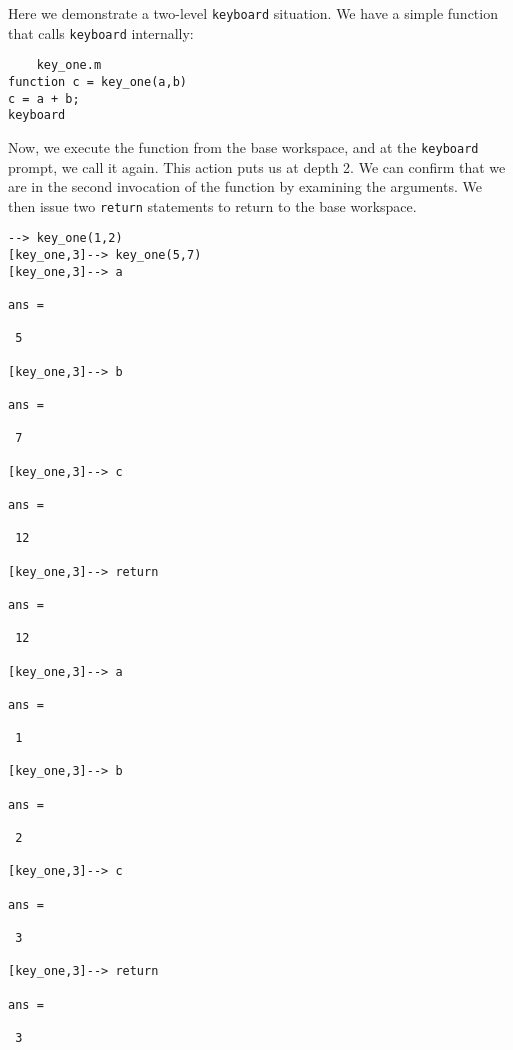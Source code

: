Here we demonstrate a two-level \verb|keyboard| situation.  We have
a simple function that calls \verb|keyboard| internally:
\begin{verbatim}
    key_one.m
function c = key_one(a,b)
c = a + b;
keyboard
\end{verbatim}
Now, we execute the function from the base workspace, and
at the \verb|keyboard| prompt, we call it again.  This action
puts us at depth 2.  We can confirm that we are in the second
invocation of the function by examining the arguments.  We
then issue two \verb|return| statements to return to the base
workspace.
\begin{verbatim}
--> key_one(1,2)
[key_one,3]--> key_one(5,7)
[key_one,3]--> a

ans = 

 5 

[key_one,3]--> b

ans = 

 7 

[key_one,3]--> c

ans = 

 12 

[key_one,3]--> return

ans = 

 12 

[key_one,3]--> a

ans = 

 1 

[key_one,3]--> b

ans = 

 2 

[key_one,3]--> c

ans = 

 3 

[key_one,3]--> return

ans = 

 3 
\end{verbatim}
